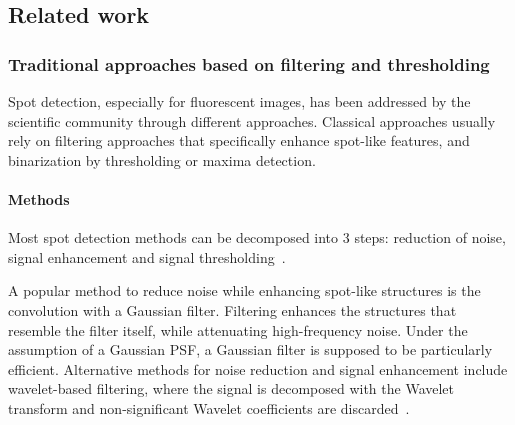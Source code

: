 \subsection{Related work}
\label{subsec:detection_related_work}

\subsubsection{Traditional approaches based on filtering and thresholding}

Spot detection, especially for fluorescent images, has been addressed by the scientific community through different approaches. Classical approaches usually rely on filtering approaches that specifically enhance spot-like features, and binarization by thresholding or maxima detection. 

\paragraph{Methods}

Most spot detection methods can be decomposed into 3 steps: reduction of noise, signal enhancement and signal thresholding~\cite{smal_quantitative_2010}. 


A popular method to reduce noise while enhancing spot-like structures is the convolution with a Gaussian filter. Filtering enhances the structures that resemble the filter itself, while attenuating high-frequency noise. Under the assumption of a Gaussian \ac{PSF}, a Gaussian filter is supposed to be particularly efficient. Alternative methods for noise reduction and signal enhancement include wavelet-based filtering, where the signal is decomposed with the Wavelet transform and non-significant Wavelet coefficients are discarded~\cite{Olivo-Marin2002}. 


